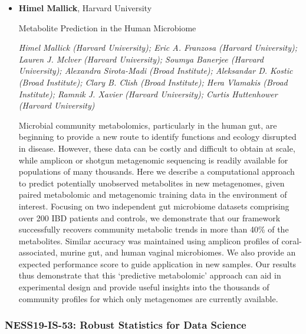 \begin{itemize}
\item \textbf{Himel Mallick}, Harvard University

Metabolite Prediction in the Human Microbiome

\emph{\footnotesize Himel Mallick (Harvard University); Eric A. Franzosa (Harvard University); Lauren J. Mclver (Harvard University); Soumya Banerjee (Harvard University); Alexandra Sirota-Madi (Broad Institute); Aleksandar D. Kostic (Broad Institute); Clary B. Clish (Broad Institute); Hera Vlamakis (Broad Institute); Ramnik J. Xavier (Harvard University); Curtis Huttenhower (Harvard University)}

Microbial community metabolomics, particularly in the human gut, are beginning to provide a new route to identify functions and ecology disrupted in disease. However, these data can be costly and difficult to obtain at scale, while amplicon or shotgun metagenomic sequencing is readily available for populations of many thousands. Here we describe a computational approach to predict potentially unobserved metabolites in new metagenomes, given paired metabolomic and metagenomic training data in the environment of interest. Focusing on two independent gut microbiome datasets comprising over 200 IBD patients and controls, we demonstrate that our framework successfully recovers community metabolic trends in more than 40\% of the metabolites. Similar accuracy was maintained using amplicon profiles of coral-associated, murine gut, and human vaginal microbiomes. We also provide an expected performance score to guide application in new samples. Our results thus demonstrate that this ‘predictive metabolomic’ approach can aid in experimental design and provide useful insights into the thousands of community profiles for which only metagenomes are currently available.

\end{itemize}

\subsubsection*{NESS19-IS-53: Robust Statistics for Data Science}

